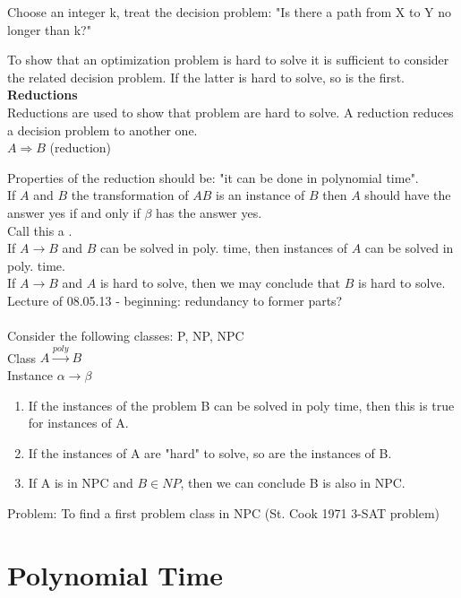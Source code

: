 \begin{example}
  Choose an integer k, treat the decision problem: "Is there a path from X to Y no longer than k?"
\end{example}  

To show that an optimization problem is hard to solve it is sufficient to consider the related decision problem. If the latter is hard to solve, so is the first. \\

\textbf{Reductions} \\
Reductions are used to show that problem are hard to solve. A reduction reduces a decision problem to another one.\\
$A \Rightarrow B$ (reduction)

Properties of the reduction should be: "it can be done in polynomial time". \\
If $A$ and $B$ the transformation of $A B$ is an instance of $B$ then $A$ should have the answer yes if and only if $\beta$ has the answer yes.\\
Call this a .\\
If $A \rightarrow B$ and $B$ can be solved in poly. time, then instances of $A$ can be solved in poly. time. \\
If $A \rightarrow B$ and $A$ is hard to solve, then we may conclude that  $B$ is hard to solve. \\
\newline
Lecture of 08.05.13 - beginning: redundancy to former parts? \\
\\ Consider the following classes: P, NP, NPC \\
Class $A \xrightarrow{poly} B$ \\
Instance $\alpha \rightarrow \beta$ \\

\begin{enumerate}[label={\arabic* Observation:}]
  \item If the instances of the problem B can be solved in poly time, then this is true for instances of A.
  \item If the instances of A are "hard" to solve, so are the instances of B.
  \item If A is in NPC and $B \in NP$, then we can conclude B is also in NPC.
\end{enumerate}
Problem: To find a first problem class in NPC (St. Cook 1971 3-SAT problem)

\section{Polynomial Time}

